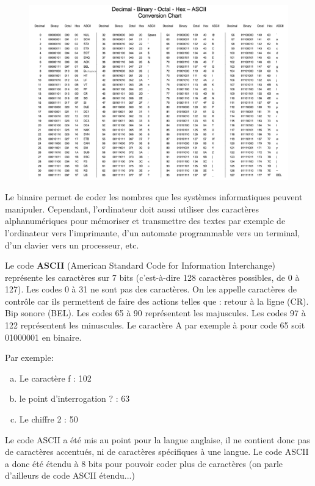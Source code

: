 \documentclass[11pt, a4paper]{book}
\begin{document}
\begin{center}
\begin{figure}[h!]
\centerline{\includegraphics[width=18cm]{images/ASCII2}}
\end{figure}
\end{center}

Le binaire permet de coder les nombres que les systèmes informatiques peuvent manipuler. Cependant, l'ordinateur doit aussi utiliser des caractères alphanumériques pour mémoriser et transmettre des textes par exemple de l’ordinateur vers l’imprimante, d’un automate programmable vers un terminal, d’un clavier vers un processeur, etc. 

Le code {\bf ASCII} (American Standard Code for Information Interchange) représente les caractères sur 7 bits (c'est-à-dire 128 caractères possibles, de 0 à 127). Les codes 0 à 31 ne sont pas des caractères. On les appelle caractères de contrôle car ils permettent de faire des actions telles que : retour à la ligne (CR). Bip sonore (BEL). Les codes 65 à 90 représentent les majuscules. Les codes 97 à 122 représentent les minuscules. Le caractère A par exemple à pour code 65 soit 01000001 en binaire. 


Par exemple: 
\begin{enumerate}[a)]
\item Le caractère f : 102 
\item le point d'interrogation ? : 63 
\item Le chiffre 2 : 50
\end{enumerate}

Le code ASCII a été mis au point pour la langue anglaise, il ne contient donc pas de caractères accentués, ni de caractères spécifiques à une langue. Le code ASCII a donc été étendu à 8 bits pour pouvoir coder plus de caractères (on parle d'ailleurs de code ASCII étendu...)
\end{document}
